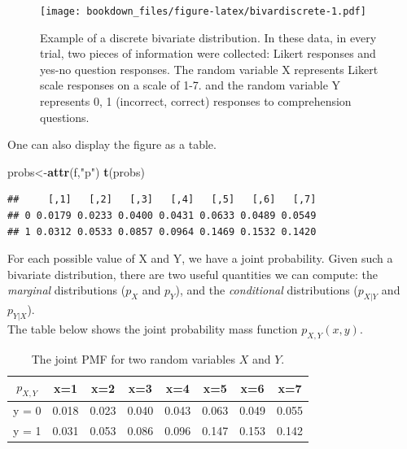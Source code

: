 \documentclass[12pt,]{krantz}
\newenvironment{Shaded}{\begin{snugshade}}{\end{snugshade}}
\newcommand{\KeywordTok}[1]{\textcolor[rgb]{0.13,0.29,0.53}{\textbf{#1}}}
\newcommand{\StringTok}[1]{\textcolor[rgb]{0.31,0.60,0.02}{#1}}
\newcommand{\NormalTok}[1]{#1}
\theoremstyle{definition}
\theoremstyle{definition}
\theoremstyle{definition}
\theoremstyle{remark}
\begin{document}
\begin{figure}
\centering
\texttt{[image: bookdown\_files/figure-latex/bivardiscrete-1.pdf]}
\caption{\label{fig:bivardiscrete}Example of a discrete bivariate
distribution. In these data, in every trial, two pieces of information
were collected: Likert responses and yes-no question responses. The
random variable X represents Likert scale responses on a scale of 1-7.
and the random variable Y represents 0, 1 (incorrect, correct) responses
to comprehension questions.}
\end{figure}

One can also display the figure as a table.

\begin{Shaded}
\begin{Highlighting}[]
\NormalTok{probs<-}\KeywordTok{attr}\NormalTok{(f,}\StringTok{"p"}\NormalTok{)}
\KeywordTok{t}\NormalTok{(probs)}
\end{Highlighting}
\end{Shaded}

\begin{verbatim}
##     [,1]   [,2]   [,3]   [,4]   [,5]   [,6]   [,7]
## 0 0.0179 0.0233 0.0400 0.0431 0.0633 0.0489 0.0549
## 1 0.0312 0.0533 0.0857 0.0964 0.1469 0.1532 0.1420
\end{verbatim}

For each possible value of X and Y, we have a joint probability. Given
such a bivariate distribution, there are two useful quantities we can
compute: the \emph{marginal} distributions (\(p_{X}\) and \(p_Y\)), and
the \emph{conditional} distributions (\(p_{X|Y}\) and \(p_{Y|X}\)).\\
The table below shows the joint probability mass function
\(p_{X,Y}(x,y)\).

\begin{table}[!htbp] 
\begin{center}
\begin{tabular}{c|ccccccc}
$p_{X,Y}$ & x=1 & x=2 & x=3 & x=4 & x=5 & x=6 & x=7\\
\hline
y = 0 & 0.018 & 0.023 & 0.040 & 0.043 & 0.063 & 0.049 & 0.055\\
y = 1 & 0.031 & 0.053 & 0.086 & 0.096 &  0.147 & 0.153 &  0.142\\
\end{tabular}
\end{center}
\caption{The joint PMF for two random variables $X$ and $Y$.}\label{discretebivartable}
\end{table}
\end{document}
